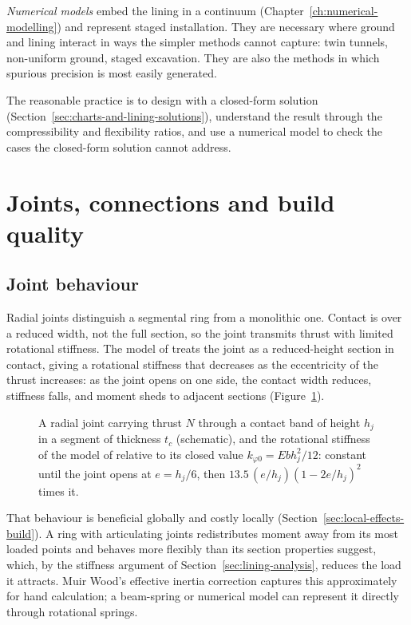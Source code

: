 \emph{Numerical models} embed the lining in a continuum
(Chapter~\ref{ch:numerical-modelling}) and represent staged installation. They
are necessary where ground and lining interact in ways the simpler methods
cannot capture: twin tunnels, non-uniform ground, staged excavation. They are also the methods in which spurious precision is most easily generated.

The reasonable practice is to design with a closed-form solution
(Section~\ref{sec:charts-and-lining-solutions}), understand
the result through the compressibility and flexibility ratios, and use a
numerical model to check the cases the closed-form solution cannot address.

\section{Joints, connections and build quality}
\label{sec:joints-and-build}

\subsection{Joint behaviour}
\label{sec:joint-behaviour}

Radial joints distinguish a segmental ring from a monolithic one.
Contact is over a reduced width, not the full section, so the joint transmits
thrust with limited rotational stiffness. The model of \citet{janssen1983gelenk} treats the joint as a
reduced-height section in contact, giving a rotational stiffness that decreases
as the eccentricity of the thrust increases: as the joint opens on one side,
the contact width reduces, stiffness falls, and moment sheds to adjacent
sections (Figure~\ref{fig:joint-stiffness}).

\begin{figure}[htbp]
\centering
{}
\caption{A radial joint carrying thrust $N$ through a contact band of height $h_j$ in a segment of thickness $t_c$ (schematic), and the rotational stiffness of the model of \citet{janssen1983gelenk} relative to its closed value $k_{\varphi 0} = E b h_j^2/12$: constant until the joint opens at $e = h_j/6$, then $13.5\,(e/h_j)(1 - 2e/h_j)^2$ times it.}
\label{fig:joint-stiffness}
\end{figure}

That behaviour is beneficial globally and costly locally
(Section~\ref{sec:local-effects-build}). A ring with articulating joints redistributes
moment away from its most loaded points and behaves more flexibly than its
section properties suggest, which, by the stiffness argument of
Section~\ref{sec:lining-analysis}, reduces the load it attracts. Muir Wood's effective inertia correction captures this approximately
for hand calculation; a beam-spring or numerical model can represent it
directly through rotational springs.

